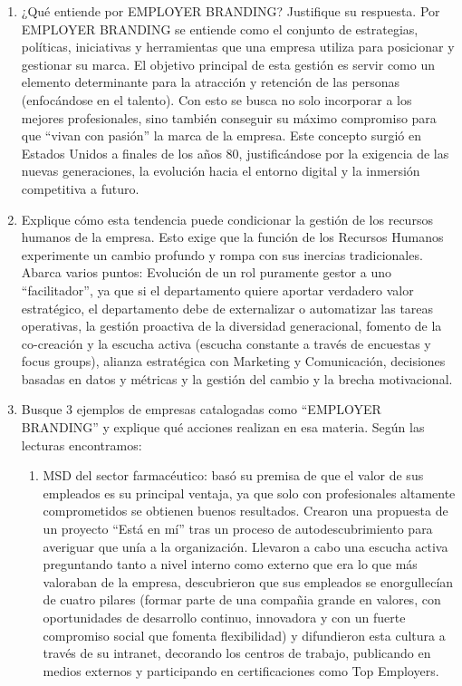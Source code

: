 \documentclass[12pt]{book} %
\begin{document}
\begin{enumerate}
    \item ¿Qué entiende por EMPLOYER BRANDING? Justifique su respuesta.
    Por EMPLOYER BRANDING se entiende como el conjunto de estrategias, políticas, iniciativas y herramientas que una empresa utiliza para posicionar y gestionar su marca. El objetivo principal de esta gestión es servir como un elemento determinante para la atracción y retención de las personas (enfocándose en el talento). Con esto se busca no solo incorporar a los mejores profesionales, sino también conseguir su máximo compromiso para que ``vivan con pasión'' la marca de la empresa. Este concepto surgió en Estados Unidos a finales de los años 80, justificándose por la exigencia de las nuevas generaciones, la evolución hacia el entorno digital y la inmersión competitiva a futuro.
    \item Explique cómo esta tendencia puede condicionar la gestión de los recursos humanos de la empresa.
    Esto exige que la función de los Recursos Humanos experimente un cambio profundo y rompa con sus inercias tradicionales. Abarca varios puntos: Evolución de un rol puramente gestor a uno ``facilitador'', ya que si el departamento quiere aportar verdadero valor estratégico, el departamento debe de externalizar o automatizar las tareas operativas, la gestión proactiva de la diversidad generacional, fomento de la co-creación y la escucha activa (escucha constante a través de encuestas y focus groups), alianza estratégica con Marketing y Comunicación, decisiones basadas en datos y métricas y la gestión del cambio y la brecha motivacional.
    \item Busque 3 ejemplos de empresas catalogadas como ``EMPLOYER BRANDING'' y explique qué acciones realizan en esa materia.
    Según las lecturas encontramos:
    \begin{enumerate}
        \item MSD del sector farmacéutico: basó su premisa de que el valor de sus empleados es su principal ventaja, ya que solo con profesionales altamente comprometidos se obtienen buenos resultados. Crearon una propuesta de un proyecto ``Está en mí'' tras un proceso de autodescubrimiento para averiguar que unía a la organización. Llevaron a cabo una escucha activa preguntando tanto a nivel interno como externo que era lo que más valoraban de la empresa, descubrieron que sus empleados se enorgullecían de cuatro pilares (formar parte de una compañia grande en valores, con oportunidades de desarrollo continuo, innovadora y con un fuerte compromiso social que fomenta flexibilidad) y difundieron esta cultura a través de su intranet, decorando los centros de trabajo, publicando en medios externos y participando en certificaciones como Top Employers.

\end{enumerate}
\end{enumerate}
\end{document}
